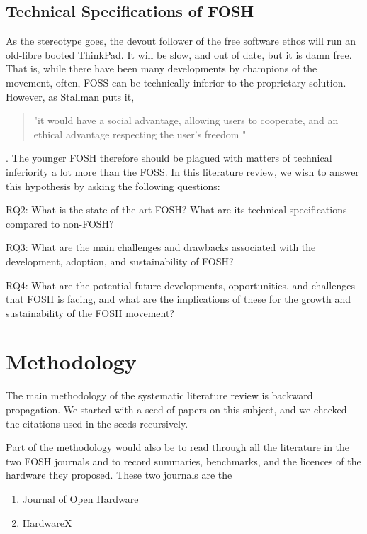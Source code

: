 \documentclass[acmtog]{acmart}
\begin{document}
\subsection{Technical Specifications of FOSH}
As the stereotype goes, the devout follower of the free software ethos will run an old-libre booted ThinkPad. It will be slow, and out of date, but it is damn free. 
That is, while there have been many developments by champions of the movement, often, FOSS can be technically inferior to the proprietary solution. 
However, as Stallman puts it, 
\begin{quote}
"it would have a social advantage, allowing users to cooperate, and an ethical advantage respecting the user's freedom "
\end{quote}
\cite{b0_stallman}.
The younger FOSH therefore should be plagued with matters of technical inferiority a lot more than the FOSS. 
In this literature review, we wish to answer this hypothesis by asking the following questions:

RQ2: What is the state-of-the-art FOSH? What are its technical specifications compared to non-FOSH? 

RQ3: What are the main challenges and drawbacks associated with the development, adoption, and sustainability of FOSH?

RQ4: What are the potential future developments, opportunities, and challenges that FOSH is facing, and what are the implications of these for the growth and sustainability of the FOSH movement?


\section{Methodology}

The main methodology of the systematic literature review is backward propagation. 
We started with a seed of papers on this subject, and we checked the citations used in the seeds recursively. 

Part of the methodology would also be to read through all the literature in the two FOSH journals and to record summaries, benchmarks, and the licences of the hardware they proposed.
These two journals are the 
\begin{enumerate}
    \item \href{https://openhardware.metajnl.com/}{Journal of Open Hardware}
    \item \href{https://www.sciencedirect.com/journal/hardwarex}{HardwareX}
\end{enumerate}
\end{document}
